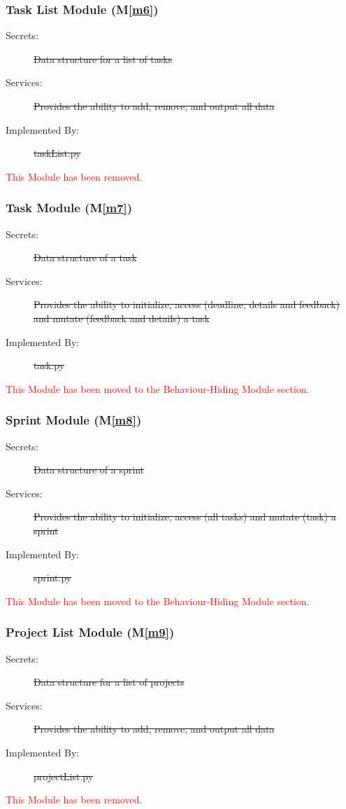 \documentclass[12pt, titlepage]{article}
\newcommand{\mref}[1]{M\ref{#1}}
\begin{document}
\subsubsection{Task List Module (\mref{m6})}
\begin{description}
    \item[Secrets:] \sout{Data structure for a list of tasks}
    \item[Services:] \sout{Provides the ability to add, remove, and output all data}
    \item[Implemented By:] \sout{taskList.py}
\end{description}
\textcolor{red}{This Module has been removed.}

\subsubsection{Task Module (\mref{m7})}
\begin{description}
    \item[Secrets:] \sout{Data structure of a task}
    \item[Services:] \sout{Provides the ability to initialize, access (deadline, details and feedback) and mutate (feedback and details) a task}
    \item[Implemented By:] \sout{task.py}
\end{description}
\textcolor{red}{This Module has been moved to the Behaviour-Hiding Module section.}

\subsubsection{Sprint Module (\mref{m8})}
\begin{description}
    \item[Secrets:] \sout{Data structure of a sprint}
    \item[Services:] \sout{Provides the ability to initialize, access (all tasks) and mutate (task) a sprint}
    \item[Implemented By:] \sout{sprint.py}
\end{description}
\textcolor{red}{This Module has been moved to the Behaviour-Hiding Module section.}

\subsubsection{Project List Module (\mref{m9})}
\begin{description}
    \item[Secrets:] \sout{Data structure for a list of projects}
    \item[Services:] \sout{Provides the ability to add, remove, and output all data}
    \item[Implemented By:] \sout{projectList.py}
\end{description}
\textcolor{red}{This Module has been removed.}
\end{document}
